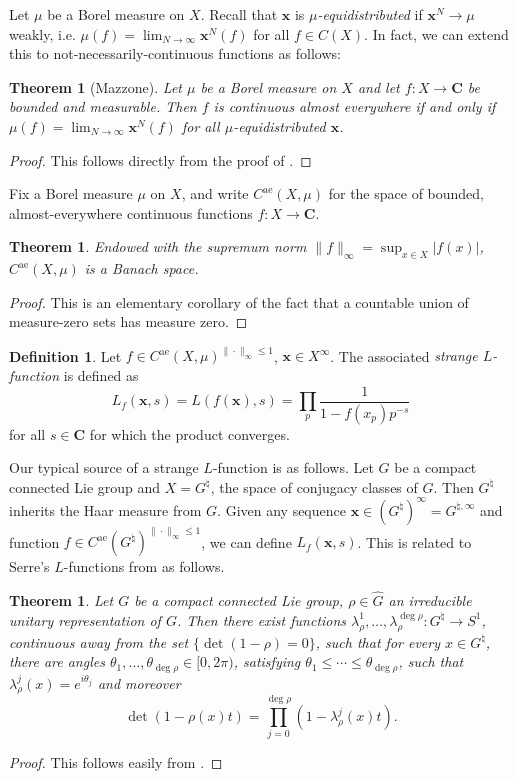 \documentclass{article}
\newcommand{\bC}{\mathbf{C}}
\newcommand{\bx}{{\boldsymbol x}}
\newcommand{\alev}{\mathrm{ae}}
\newtheorem{theorem}[subsection]{Theorem}
\theoremstyle{definition}
\newtheorem{definition}[subsection]{Definition}
\begin{document}
Let $\mu$ be a Borel measure on $X$. Recall that $\bx$ is 
\emph{$\mu$-equidistributed} if $\bx^N\to \mu$ weakly, i.e. 
$\mu(f) = \lim_{N\to \infty}\bx^N(f)$ for all $f\in C(X)$. In fact, we can 
extend this to not-necessarily-continuous functions as follows:

\begin{theorem}[Mazzone]
Let $\mu$ be a Borel measure on $X$ and let $f\colon X\to \bC$ be bounded and 
measurable. Then $f$ is continuous almost everywhere if and only if 
$\mu(f)=\lim_{N\to \infty}\bx^N(f)$ for all $\mu$-equidistributed $\bx$. 
\end{theorem}
\begin{proof}
This follows directly from the proof of \cite[Th.1]{mazzone-1995}.
\end{proof}

Fix a Borel measure $\mu$ on $X$, and write $C^\alev(X,\mu)$ for the space of 
bounded, almost-everywhere continuous functions $f\colon X\to \bC$. 


\begin{theorem}
Endowed with the supremum norm $\|f\|_\infty=\sup_{x\in X} |f(x)|$, 
$C^\alev(X,\mu)$ is a Banach space. 
\end{theorem}
\begin{proof}
This is an elementary corollary of the fact that a countable union of 
measure-zero sets has measure zero. 
\end{proof}

\begin{definition}
Let $f\in C^\alev(X,\mu)^{\|\cdot\|_\infty\leqslant 1}$, $\bx\in X^\infty$. The 
associated \emph{strange $L$-function} is defined as 
\[
	L_f(\bx,s) = L(f(\bx),s) = \prod_p \frac{1}{1-f(x_p) p^{-s}} 
\]
for all $s\in \bC$ for which the product converges. 
\end{definition}

Our typical source of a strange $L$-function is as follows. Let $G$ be a 
compact connected Lie group and $X=G^\natural$, the space of conjugacy 
classes of $G$. Then $G^\natural$ inherits the Haar measure from $G$. Given 
any sequence $\bx\in (G^\natural)^\infty = G^{\natural,\infty}$ and 
function $f\in C^\alev(G^\natural)^{\|\cdot\|_\infty\leqslant 1}$, we can 
define $L_f(\bx,s)$. This is 
related to Serre's $L$-functions from \cite[A.2]{serre-1968} as follows. 

\begin{theorem}
Let $G$ be a compact connected Lie group, $\rho\in\widehat G$ an irreducible 
unitary representation of $G$. Then there exist functions 
$\lambda_\rho^1,\dots,\lambda_\rho^{\deg\rho}\colon G^\natural \to S^1$, 
continuous away from the set $\{\det(1-\rho)=0\}$, such that for every 
$x\in G^\natural$, there are angles 
$\theta_1,\dots,\theta_{\deg\rho}\in [0,2\pi)$, satisfying 
$\theta_1\leqslant \cdots \leqslant \theta_{\deg\rho}$, such that 
$\lambda_\rho^j(x) = e^{i \theta_j}$ and moreover
\[
	\det(1-\rho(x) t) = \prod_{j=0}^{\deg \rho} (1-\lambda_\rho^j(x) t) .
\]
\end{theorem}
\begin{proof}
This follows easily from \cite[Lem.1.0.9]{katz-sarnak-1999}. 
\end{proof}
\end{document}
